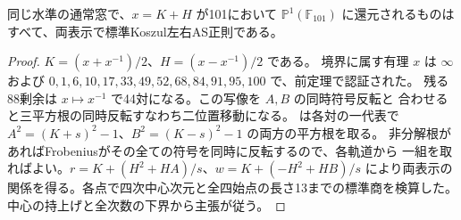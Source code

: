\begin{corollary}\label{cor:rank-fifteen-pencil-linear-residues}
同じ水準の通常窓で、$x=K+H$ が101において $\mathbb P^1(\mathbb F_{101})$
に還元されるものはすべて、両表示で標準Koszul左右AS正則である。
\end{corollary}
\begin{proof}
$K=(x+x^{-1})/2$、$H=(x-x^{-1})/2$ である。
境界に属す有理 $x$ は $\infty$ および
$0,1,6,10,17,33,49,52,68,84,91,95,100$ で、前定理で認証された。
残る88剰余は $x\mapsto x^{-1}$ で44対になる。この写像を $A,B$ の同時符号反転と
合わせると三平方根の同時反転すなわち二位置移動になる。
 は各対の一代表で
$A^2=(K+s)^2-1$、$B^2=(K-s)^2-1$ の両方の平方根を取る。
非分解根があればFrobeniusがその全ての符号を同時に反転するので、各軌道から
一組を取ればよい。$r=K+(H^2+HA)/s$、$w=K+(-H^2+HB)/s$ により両表示の
関係を得る。各点で四次中心次元と全四始点の長さ13までの標準商を検算した。
中心の持上げと全次数の下界から主張が従う。
\end{proof}

